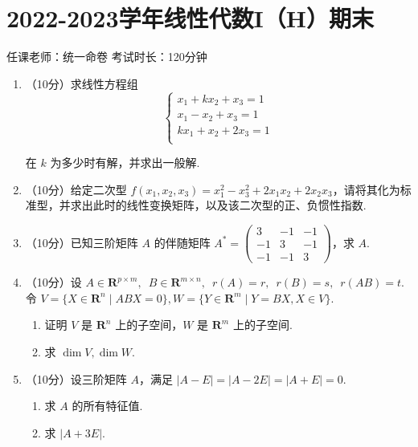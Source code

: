 \section{2022-2023学年线性代数I（H）期末}

\begin{center}
    任课老师：统一命卷\hspace{4em} 考试时长：120分钟
\end{center}

\begin{enumerate}
    \item （10分）求线性方程组
    \[\begin{cases}
      x_1+kx_2+x_3= 1 \\
      x_1-x_2+x_3= 1 \\
      kx_1+x_2+2x_3= 1 \\
    \end{cases}\]

    在 $k$ 为多少时有解，并求出一般解.
    \item （10分）给定二次型 $f(x_1,x_2,x_3)=x_1^2-x_3^2+2x_1x_2+2x_2x_3$，请将其化为标准型，并求出此时的线性变换矩阵，以及该二次型的正、负惯性指数.
    \item （10分）已知三阶矩阵 $A$ 的伴随矩阵 $A^*=\begin{pmatrix}
        3 & -1 &- 1 \\
        -1 & 3 & -1 \\
        -1 & -1 & 3
    \end{pmatrix} $，求 $A$.

    \item （10分）设 $A\in \mathbf R^{p\times m},\enspace B\in \mathbf R^{m\times n},\enspace r(A)=r,\enspace r(B)=s,\enspace r(AB)=t$. 令 $V=\{X\in \mathbf R^n\mid ABX=0\},W=\{Y\in \mathbf R^m\mid Y=BX,X\in V\}$.
    \begin{enumerate}
        \item 证明 $V$ 是 $\mathbf R^n$ 上的子空间，$W$ 是 $\mathbf R^m$ 上的子空间.
        \item 求 $\dim V,\dim W$.
    \end{enumerate}

    \item （10分）设三阶矩阵 $A$，满足 $|A-E|=|A-2E|=|A+E|=0$.
    \begin{enumerate}
        \item 求 $A$ 的所有特征值.
        \item 求 $|A+3E|$.
    \end{enumerate}


\end{enumerate}
